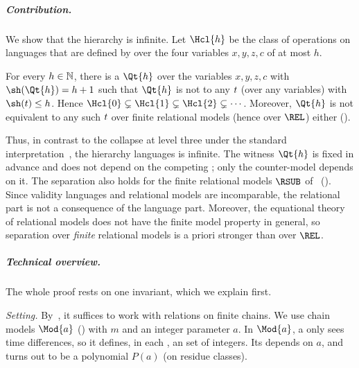 \subparagraph*{Contribution.}
We show that the hierarchy is infinite.
Let $\Hcl{h}$ be the class of operations on languages that are defined by  over the four variables $x, y, z, c$ of  at most $h$.
\begin{theorem}\label{theorem: main}
    For every $h \in \mathbb{N}$, there is a  $\Qt{h}$ over the variables $x, y, z, c$ with $\sh(\Qt{h}) = h+1$ such that $\Qt{h}$ is not  to any  $\term$ (over any variables) with $\sh(\term) \le h$.
    Hence $\Hcl{0} \subsetneq \Hcl{1} \subsetneq \Hcl{2} \subsetneq \cdots$.
    Moreover, $\Qt{h}$ is not equivalent to any such $\term$ over finite relational models (hence over $\REL$) either ().
\end{theorem}
Thus, in contrast to the collapse at level three under the standard interpretation~\cite{openaiGeneralizedStarHeight2026}, the hierarchy  languages is infinite.
The witness $\Qt{h}$ is fixed in advance and does not depend on the competing ;
only the counter-model depends on it.
The separation also holds for the finite relational models $\RSUB$ of~\cite{nakamuraFiniteRelationalSemantics2025} ().
Since validity  languages and  relational models are incomparable, the relational part is not a consequence of the language part. Moreover, the equational theory of relational models does not have the finite model property in general, so separation over \emph{finite} relational models is a priori stronger than over $\REL$.

\subparagraph*{Technical overview.}
The whole proof rests on one invariant, which we explain first.

\emph{Setting.}
By~\cite{nakamuraFiniteRelationalSemantics2025}, it suffices to work with relations on finite chains.
We use chain models $\Mod{a}$ () with $m$  and an integer parameter $a$.
In $\Mod{a}$, a  only sees time differences, so it defines, in each , an  set of integers.
Its  depends on $a$, and turns out to be a polynomial $P(a)$ (on residue classes).

